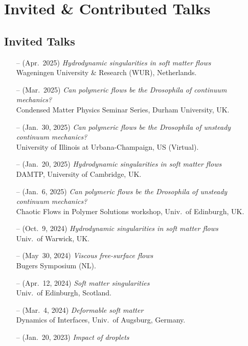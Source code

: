\documentclass[10pt,a4paper,colorlinks,linkcolor=blue,urlcolor=blue,citecolor=blue]{moderncv}
\begin{document}
\section{Invited \& Contributed Talks}

\subsection{Invited Talks}
\begin{itemize}[leftmargin=1.25em]
\item[--] (Apr.~2025) \emph{Hydrodynamic singularities in soft matter flows} \\
  Wageningen University \& Research (WUR), Netherlands.
\item[--] (Mar.~2025) \emph{Can polymeric flows be the Drosophila of continuum mechanics?} \\
  Condensed Matter Physics Seminar Series, Durham University, UK.
\item[--] (Jan.~30, 2025) \emph{Can polymeric flows be the Drosophila of unsteady continuum mechanics?} \\
  University of Illinois at Urbana-Champaign, US (Virtual).
\item[--] (Jan.~20, 2025) \emph{Hydrodynamic singularities in soft matter flows} \\
  DAMTP, University of Cambridge, UK.
\item[--] (Jan.~6, 2025) \emph{Can polymeric flows be the Drosophila of unsteady continuum mechanics?}\\
  Chaotic Flows in Polymer Solutions workshop, Univ.~of Edinburgh, UK.
\item[--] (Oct.~9, 2024) \emph{Hydrodynamic singularities in soft matter flows} \\
  Univ.~of Warwick, UK.
\item[--] (May~30, 2024) \emph{Viscous free-surface flows} \\
  Bugers Symposium (NL).
\item[--] (Apr.~12, 2024) \emph{Soft matter singularities} \\
  Univ.~of Edinburgh, Scotland.
\item[--] (Mar.~4, 2024) \emph{Deformable soft matter} \\
  Dynamics of Interfaces, Univ.~of Augsburg, Germany.
\item[--] (Jan.~20, 2023) \emph{Impact of droplets} \\

\end{itemize}
\end{document}

